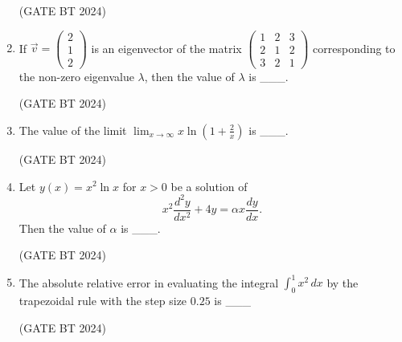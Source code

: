 \documentclass[journal,12pt,onecolumn]{IEEEtran}
\theoremstyle{remark}
\begin{document}
\begin{enumerate}
\hfill (GATE BT 2024)

\item If $\vec{v}=\begin{pmatrix}2\\[2pt]1\\[2pt]2\end{pmatrix}$ is an eigenvector of the matrix
$\begin{pmatrix}
1 & 2 & 3\\
2 & 1 & 2\\
3 & 2 & 1
\end{pmatrix}$ corresponding to the non-zero eigenvalue $\lambda$, then the value of $\lambda$ is \_\_\_.

\hfill (GATE BT 2024)

\item The value of the limit $\displaystyle \lim_{x\to\infty} x\ln\!\left(1+\frac{2}{x}\right)$ is \_\_\_.

\hfill (GATE BT 2024)

\item Let $y(x)=x^2\ln x$ for $x>0$ be a solution of
\[
x^2\frac{d^2 y}{dx^2}+4y=\alpha x\frac{dy}{dx}.
\]
Then the value of $\alpha$ is \_\_\_.

\hfill (GATE BT 2024)

\item The absolute relative error in evaluating the integral $\displaystyle \int_{0}^{1} x^2\,dx$ by the trapezoidal rule with the step size $0.25$ is \_\_\_%

\hfill (GATE BT 2024)

\end{enumerate}
\end{document}
